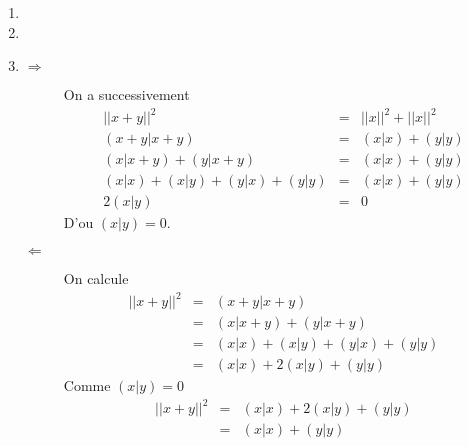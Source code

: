 \documentclass[11pt,a4paper]{article} %
\begin{document}
\begin{enumerate}
	\item
	\item
	\item
		\begin{description}
			\item[$\Rightarrow$]
				On a successivement
				\begin{eqnarray*}
					||x + y||^2 & = & ||x||^2 + ||x||^2\\
					(x+y|x+y)   & = & (x|x) + (y|y)\\
					(x|x+y) + (y|x+y) & = & (x|x) + (y|y)\\
					(x|x) + (x|y) + (y|x) + (y|y) & = & (x|x) + (y|y)\\
					2(x|y) & = & 0
				\end{eqnarray*}
				D'ou $(x|y) = 0$.
			\item[$\Leftarrow$]
				On calcule
				\begin{eqnarray*}
					||x + y||^2 & = & (x+y|x+y)\\
					& = & (x|x+y) + (y|x+y)\\
					& = & (x|x) + (x|y) + (y|x) + (y|y)\\
					& = & (x|x) + 2(x|y) + (y|y)
				\end{eqnarray*}
				Comme $(x|y) = 0$
				\begin{eqnarray*}
					||x + y||^2 & = & (x|x) + 2(x|y) + (y|y)\\
					& = & (x|x) + (y|y)
				\end{eqnarray*}
		\end{description}
\end{enumerate}
\end{document}
